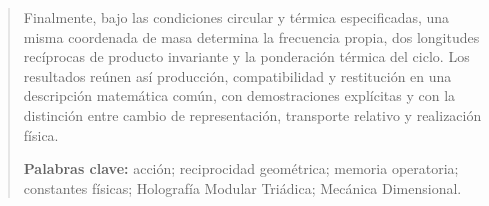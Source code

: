 \begin{abstract}
Finalmente, bajo las
condiciones circular y térmica especificadas, una misma coordenada de masa
determina la frecuencia propia, dos longitudes recíprocas de producto
invariante y la ponderación térmica del ciclo. Los resultados reúnen así
producción, compatibilidad y restitución en una descripción matemática
común, con demostraciones explícitas y con la distinción entre cambio de
representación, transporte relativo y realización física.

\par\smallskip\noindent\textbf{Palabras clave:} acción; reciprocidad geométrica; memoria operatoria; constantes físicas; Holografía Modular Triádica; Mecánica Dimensional.
\end{abstract}


\endgroup

